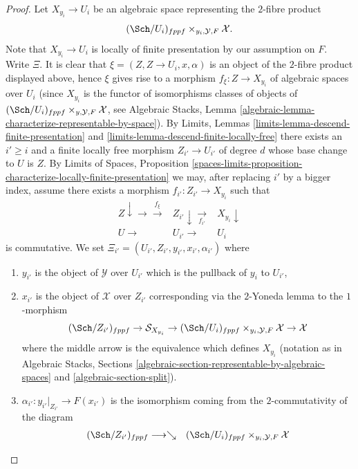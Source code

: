 \begin{proof}
\medskip\noindent
Let $X_{y_i} \to U_i$ be an algebraic space representing the $2$-fibre
product
$$
(\Sch/U_i)_{fppf} \times_{y_i, \mathcal{Y}, F} \mathcal{X}.
$$
Note that $X_{y_i} \to U_i$ is locally of finite presentation by our
assumption on $F$. Write $\Xi $. It is clear that
$\xi = (Z, Z \to U_i, x, \alpha)$ is an object of the $2$-fibre product
displayed above, hence $\xi$ gives rise to a morphism
$f_\xi : Z \to X_{y_i}$ of algebraic spaces over $U_i$
(since $X_{y_i}$ is the functor of isomorphisms classes of objects of
$(\Sch/U_i)_{fppf} \times_{y, \mathcal{Y}, F} \mathcal{X}$, see
Algebraic Stacks,
Lemma \ref{algebraic-lemma-characterize-representable-by-space}).
By
Limits, Lemmas \ref{limits-lemma-descend-finite-presentation} and
\ref{limits-lemma-descend-finite-locally-free}
there exists an $i' \geq i$ and a finite locally free morphism
$Z_{i'} \to U_{i'}$ of degree $d$ whose base change to $U$ is $Z$. By
Limits of Spaces, Proposition
\ref{spaces-limits-proposition-characterize-locally-finite-presentation}
we may, after replacing $i'$ by a bigger index, assume there exists a
morphism $f_{i'} : Z_{i'} \to X_{y_i}$ such that
$$
\begin{array}{ccc}Z \downarrow\longrightarrow\overset{f_\xi}{\longrightarrow} & Z_{i'} \downarrow\underset{f_{i'}}{\longrightarrow} & X_{y_i} \downarrow \\ U \longrightarrow & U_{i'} \longrightarrow & U_i\end{array}
$$
is commutative. We set
$\Xi_{i'} = (U_{i'}, Z_{i'}, y_{i'}, x_{i'}, \alpha_{i'})$
where
\begin{enumerate}
\item $y_{i'}$ is the object of $\mathcal{Y}$ over $U_{i'}$
which is the pullback of $y_i$ to $U_{i'}$,
\item $x_{i'}$ is the object of $\mathcal{X}$ over $Z_{i'}$ corresponding
via the $2$-Yoneda lemma to the $1$-morphism
$$
(\Sch/Z_{i'})_{fppf} \to
\mathcal{S}_{X_{y_i}} \to
(\Sch/U_i)_{fppf} \times_{y_i, \mathcal{Y}, F} \mathcal{X} \to
\mathcal{X}
$$
where the middle arrow is the equivalence which defines $X_{y_i}$
(notation as in
Algebraic Stacks, Sections
\ref{algebraic-section-representable-by-algebraic-spaces} and
\ref{algebraic-section-split}).
\item $\alpha_{i'} : y_{i'}|_{Z_{i'}} \to F(x_{i'})$ is the isomorphism
coming from the $2$-commutativity of the diagram
$$
\begin{array}{ccc}(\Sch/Z_{i'})_{fppf} \longrightarrow\searrow & (\Sch/U_i)_{fppf} \times_{y_i, \mathcal{Y}, F} \mathcal{X}

\end{array}$$
\end{enumerate}
\end{proof}
